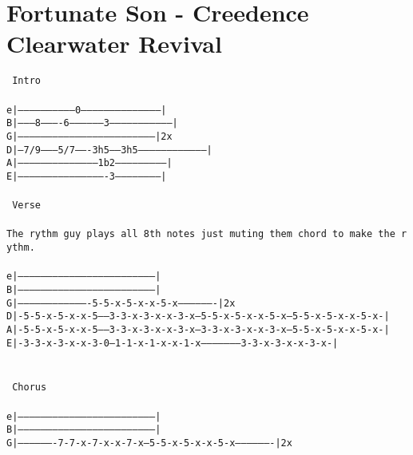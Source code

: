 \newpage
\section{Fortunate Son - Creedence Clearwater Revival}
\label{Fortunate Son - Creedence Clearwater Revival}
\texttt{\lbrack\ Intro\rbrack\ \\
\\
e|-----------------------------0-----------------------------------------|\\
B|--------8----------6------------------3--------------------------------|\\
G|-----------------------------------------------------------------------|2x\\
D|---7/9--------5/7-------3h5------3h5-----------------------------------|\\
A|------------------------------------------1b2--------------------------|\\
E|----------------------------------------------3------------------------|\\
\\
\lbrack\ Verse\rbrack\ \\
\\
The\ rythm\ guy\ plays\ all\ 8th\ notes\ just\ muting\ them\ chord\ to\ make\ the\ rythm.\\
\\
e|-----------------------------------------------------------------------|\\
B|-----------------------------------------------------------------------|\\
G|-------------------------------------5-5-x-5-x-x-5-x-------------------|2x\\
D|-5-5-x-5-x-x-5-----3-3-x-3-x-x-3-x---5-5-x-5-x-x-5-x---5-5-x-5-x-x-5-x-|\\
A|-5-5-x-5-x-x-5-----3-3-x-3-x-x-3-x---3-3-x-3-x-x-3-x---5-5-x-5-x-x-5-x-|\\
E|-3-3-x-3-x-x-3-0---1-1-x-1-x-x-1-x---------------------3-3-x-3-x-x-3-x-|\\
\\
\\
\lbrack\ Chorus\rbrack\\
\\
e|-----------------------------------------------------------------------|\\
B|-----------------------------------------------------------------------|\\
G|-------------------7-7-x-7-x-x-7-x---5-5-x-5-x-x-5-x-------------------|2x\\
}
